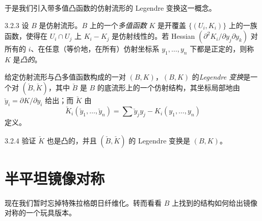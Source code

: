
于是我们引入带多值凸函数的仿射流形的 Legendre 变换这一概念。

\begin{definition}{3.2.3}
设 $B$ 是仿射流形。$B$ 上的一个\emph{多值函数} $K$ 是开覆盖 $\{(U_i,K_i)\}$ 上的一族函数，使得在 $U_i\cap U_j$ 上 $K_i-K_j$ 是仿射线性的。若 Hessian $(\partial^2K_i/\partial y_j\partial y_k)$ 对所有的 $i$、在任意（等价地，在所有）仿射坐标系 $y_1,\dots,y_n$ 下都是正定的，则称 $K$ 是\emph{凸的}。

给定仿射流形与凸多值函数构成的一对 $(B,K)$，$(B,K)$ 的\emph{Legendre 变换}是一个对 $(\check B,\check K)$，其中 $\check B$ 是 $B$ 的底流形上的一个仿射结构，其坐标局部地由 $\check y_i=\partial K/\partial y_i$ 给出；而 $\check K$ 由
\begin{equation*}
\check K_i(\check y_1,\dots,\check y_n)=\sum\check y_jy_j-K_i(y_1,\dots,y_n)
\end{equation*}
定义。
\end{definition}


\begin{exercise}{3.2.4}
验证 $\check K$ 也是凸的，并且 $(\check B,\check K)$ 的 Legendre 变换是 $(B,K)$。
\end{exercise}

\section{半平坦镜像对称}

现在我们暂时忘掉特殊拉格朗日纤维化。转而看看 $B$ 上找到的结构如何给出镜像对称的一个玩具版本。

